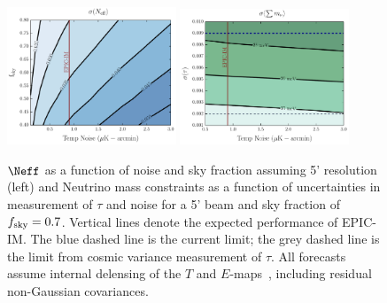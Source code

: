 
\begin{figure}[t!]
\begin{center}
\includegraphics[width=0.45\textwidth]{figs/Neff.pdf}
\includegraphics[width=0.45\textwidth]{figs/Mnu_tauprior.pdf}
\caption{ \small \setlength{\baselineskip}{0.95\baselineskip}
$\Neff$ as a function of noise and sky fraction assuming 5' resolution (left) and
Neutrino mass constraints as a function of uncertainties in measurement of $\tau$ and noise for a 5' beam and 
sky fraction of $f_{\rm sky} = 0.7$. 
Vertical lines denote the expected performance of EPIC-IM. 
The blue dashed line is the current \planck limit; the grey dashed line is the limit from cosmic variance 
measurement of $\tau$. All forecasts assume internal delensing of the $T$ and $E$-maps~\cite{Green:2016cjr}, including residual non-Gaussian covariances.
\label{fig:Neff_future} }
\end{center}
\vspace{-0.15in}
\end{figure}

